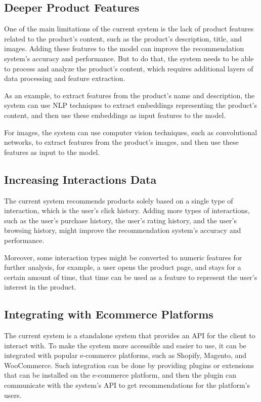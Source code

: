 \subsection{Deeper Product Features}

One of the main limitations of the current system is the lack of product features related to the product's content, such as the product's description, title, and images.
Adding these features to the model can improve the recommendation system's accuracy and performance. 
But to do that, the system needs to be able to process and analyze the product's content, which requires additional layers of data processing and feature extraction.

As an example, to extract features from the product's name and description, the system can use NLP
techniques to extract embeddings representing the product's content, and then use these embeddings as input features to the model.

For images, the system can use computer vision techniques, such as convolutional networks, to extract features from the product's images, and then use these features as input to the model.

\subsection{Increasing Interactions Data}

The current system recommends products solely based on a single type of interaction, which is the user's click history.
Adding more types of interactions, such as the user's purchase history, the user's rating history, and the user's browsing history, 
might improve the recommendation system's accuracy and performance.

Moreover, some interaction types might be converted to numeric features for further analysis,
 for example, a user opens the product page, and stays for a certain amount of time, 
 that time can be used as a feature to represent the user's interest in the product.

 \subsection{Integrating with Ecommerce Platforms}

The current system is a standalone system that provides an API for the client to interact with.
To make the system more accessible and easier to use, it can be integrated with popular e-commerce platforms, such as Shopify, Magento, and WooCommerce.
Such integration can be done by providing plugins or extensions that can be installed on the e-commerce platform, 
and then the plugin can communicate with the system's API to get recommendations for the platform's users.

